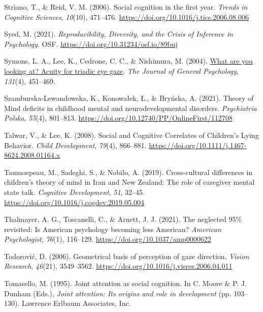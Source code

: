 \documentclass[
]{scrbook}
\newlength{\cslhangindent}
\newenvironment{CSLReferences}[2] %
 {\begin{list}{}{%
  \setlength{\itemindent}{0pt}
  \setlength{\leftmargin}{0pt}
  \setlength{\parsep}{0pt}
  \ifodd #1
   \setlength{\leftmargin}{\cslhangindent}
   \setlength{\itemindent}{-1\cslhangindent}
  \fi
  \setlength{\itemsep}{#2\baselineskip}}}
 {\end{list}}
\begin{document}
\begin{CSLReferences}{1}{0}
Striano, T., \& Reid, V. M. (2006). Social cognition in the first year. \emph{Trends in Cognitive Sciences}, \emph{10}(10), 471--476. \url{https://doi.org/10.1016/j.tics.2006.08.006}

Syed, M. (2021). \emph{Reproducibility, {Diversity}, and the {Crisis} of {Inference} in {Psychology}}. OSF. \url{https://doi.org/10.31234/osf.io/89buj}

Symons, L. A., Lee, K., Cedrone, C. C., \& Nishimura, M. (2004). \href{https://www.ncbi.nlm.nih.gov/pmc/articles/PMC2564292}{What are you looking at? {Acuity} for triadic eye gaze}. \emph{The Journal of General Psychology}, \emph{131}(4), 451--469.

Szamburska-Lewandowska, K., Konowałek, Ł., \& Bryńska, A. (2021). Theory of {Mind} deficits in childhood mental and neurodevelopmental disorders. \emph{Psychiatria Polska}, \emph{55}(4), 801--813. \url{https://doi.org/10.12740/PP/OnlineFirst/112708}

Talwar, V., \& Lee, K. (2008). Social and {Cognitive Correlates} of {Children}'s {Lying Behavior}. \emph{Child Development}, \emph{79}(4), 866--881. \url{https://doi.org/10.1111/j.1467-8624.2008.01164.x}

Taumoepeau, M., Sadeghi, S., \& Nobilo, A. (2019). Cross-cultural differences in children's theory of mind in {Iran} and {New Zealand}: {The} role of caregiver mental state talk. \emph{Cognitive Development}, \emph{51}, 32--45. \url{https://doi.org/10.1016/j.cogdev.2019.05.004}

Thalmayer, A. G., Toscanelli, C., \& Arnett, J. J. (2021). The neglected 95\% revisited: {Is American} psychology becoming less {American}? \emph{American Psychologist}, \emph{76}(1), 116--129. \url{https://doi.org/10.1037/amp0000622}

Todorović, D. (2006). Geometrical basis of perception of gaze direction. \emph{Vision Research}, \emph{46}(21), 3549--3562. \url{https://doi.org/10.1016/j.visres.2006.04.011}

Tomasello, M. (1995). Joint attention as social cognition. In C. Moore \& P. J. Dunham (Eds.), \emph{Joint attention: {Its} origins and role in development} (pp. 103--130). Lawrence Erlbaum Associates, Inc.


\end{CSLReferences}
\end{document}

